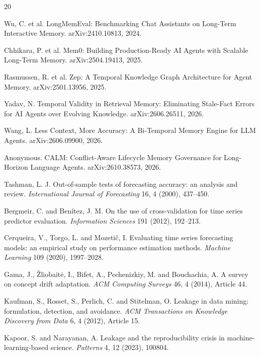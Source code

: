 \documentclass[sigconf,nonacm]{acmart}
\begin{document}
\begin{thebibliography}{20}

Wu, C. et al. LongMemEval: Benchmarking Chat Assistants on Long-Term Interactive Memory. arXiv:2410.10813, 2024.

Chhikara, P. et al. Mem0: Building Production-Ready AI Agents with Scalable Long-Term Memory. arXiv:2504.19413, 2025.

Rasmussen, R. et al. Zep: A Temporal Knowledge Graph Architecture for Agent Memory. arXiv:2501.13956, 2025.

Yadav, N. Temporal Validity in Retrieval Memory: Eliminating Stale-Fact Errors for AI Agents over Evolving Knowledge. arXiv:2606.26511, 2026.

Wang, L. Less Context, More Accuracy: A Bi-Temporal Memory Engine for LLM Agents. arXiv:2606.09900, 2026.

Anonymous. CALM: Conflict-Aware Lifecycle Memory Governance for Long-Horizon Language Agents. arXiv:2610.38573, 2026.

Tashman, L. J. Out-of-sample tests of forecasting accuracy: an analysis and review. \emph{International Journal of Forecasting} 16, 4 (2000), 437--450.

Bergmeir, C. and Benítez, J. M. On the use of cross-validation for time series predictor evaluation. \emph{Information Sciences} 191 (2012), 192--213.

Cerqueira, V., Torgo, L. and Mozetič, I. Evaluating time series forecasting models: an empirical study on performance estimation methods. \emph{Machine Learning} 109 (2020), 1997--2028.

Gama, J., Žliobaitė, I., Bifet, A., Pechenizkiy, M. and Bouchachia, A. A survey on concept drift adaptation. \emph{ACM Computing Surveys} 46, 4 (2014), Article 44.

Kaufman, S., Rosset, S., Perlich, C. and Stitelman, O. Leakage in data mining: formulation, detection, and avoidance. \emph{ACM Transactions on Knowledge Discovery from Data} 6, 4 (2012), Article 15.

Kapoor, S. and Narayanan, A. Leakage and the reproducibility crisis in machine-learning-based science. \emph{Patterns} 4, 12 (2023), 100804.
\end{thebibliography}
\end{document}
